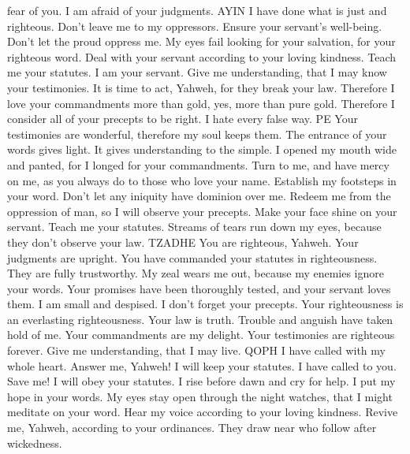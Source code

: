 fear of you. I am afraid of your judgments. AYIN  I have
done what is just and righteous. Don't leave me to my oppressors.
 Ensure your servant's well-being. Don't let the proud
oppress me.  My eyes fail looking for your salvation, for
your righteous word.  Deal with your servant according to
your loving kindness. Teach me your statutes.  I am your
servant. Give me understanding, that I may know your testimonies.
 It is time to act, Yahweh, for they break your law.
 Therefore I love your commandments more than gold, yes,
more than pure gold.  Therefore I consider all of your
precepts to be right. I hate every false way. PE  Your
testimonies are wonderful, therefore my soul keeps them. 
The entrance of your words gives light. It gives understanding to the
simple.  I opened my mouth wide and panted, for I longed
for your commandments.  Turn to me, and have mercy on me,
as you always do to those who love your name.  Establish
my footsteps in your word. Don't let any iniquity have dominion over me.
 Redeem me from the oppression of man, so I will observe
your precepts.  Make your face shine on your servant.
Teach me your statutes.  Streams of tears run down my
eyes, because they don't observe your law. TZADHE  You are
righteous, Yahweh. Your judgments are upright.  You have
commanded your statutes in righteousness. They are fully trustworthy.
 My zeal wears me out, because my enemies ignore your
words.  Your promises have been thoroughly tested, and
your servant loves them.  I am small and despised. I don't
forget your precepts.  Your righteousness is an
everlasting righteousness. Your law is truth.  Trouble and
anguish have taken hold of me. Your commandments are my delight.
 Your testimonies are righteous forever. Give me
understanding, that I may live. QOPH  I have called with
my whole heart. Answer me, Yahweh! I will keep your statutes.
 I have called to you. Save me! I will obey your statutes.
 I rise before dawn and cry for help. I put my hope in
your words.  My eyes stay open through the night watches,
that I might meditate on your word.  Hear my voice
according to your loving kindness. Revive me, Yahweh, according to your
ordinances.  They draw near who follow after wickedness.
